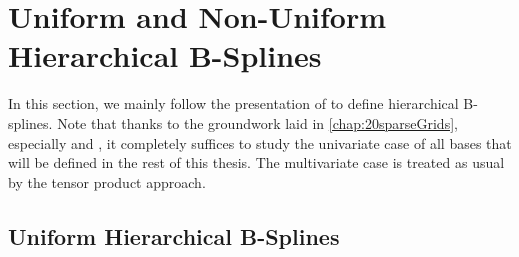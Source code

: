 \section{Uniform and Non-Uniform Hierarchical B-Splines}
\label{sec:31standardBSplines}



In this section, we mainly follow the presentation of
\cite{Valentin14Hierarchische,Valentin16Hierarchical}
to define hierarchical B-splines.
Note that thanks to the groundwork laid in \cref{chap:20sparseGrids},
especially  and
,
it completely suffices to study the univariate case
of all bases that will be defined in the rest of this thesis.
The multivariate case is treated as usual by the tensor product approach.



\subsection{Uniform Hierarchical B-Splines}



